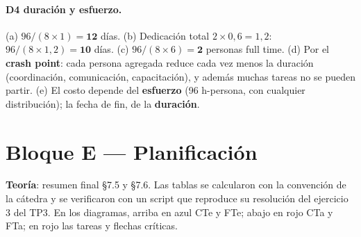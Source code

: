 \documentclass[11pt,a4paper]{article}
\begin{document}
\paragraph{D4 duración y esfuerzo.} (a) $96 / (8 \times 1) = \mathbf{12}$ días. (b) Dedicación total $2 \times
0{,}6 = 1{,}2$: $96 / (8 \times 1{,}2) = \mathbf{10}$ días. (c) $96 / (8 \times 6) = \mathbf{2}$ personas full
time. (d) Por el \textbf{crash point}: cada persona agregada reduce cada vez menos la duración (coordinación,
comunicación, capacitación), y además muchas
tareas no se pueden partir. (e) El costo depende del \textbf{esfuerzo} (96 h-persona, con cualquier
distribución); la fecha de fin, de la \textbf{duración}.

\section{Bloque E --- Planificación}
\textbf{Teoría}: resumen final §7.5 y §7.6. Las tablas se calcularon con la convención de la cátedra y se
verificaron con un script que reproduce su resolución del ejercicio 3 del TP3. En los diagramas, arriba en azul
CTe y FTe; abajo en rojo CTa y FTa; en rojo las tareas y flechas críticas.
\end{document}

